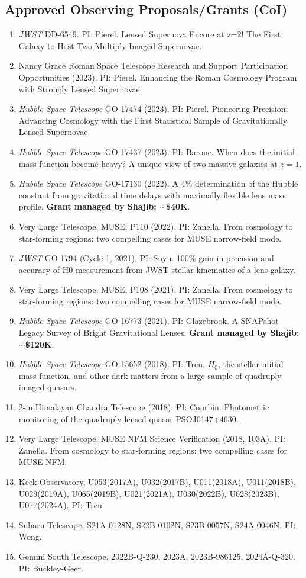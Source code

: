 \documentclass[margin, line]{res}
\begin{document}
\begin{resume}
\section{\sc Approved Observing Proposals/Grants (CoI)}
\begin{enumerate}
\item \textit{JWST} DD-6549. PI: Pierel. Lensed Supernova Encore at z=2! The First Galaxy to Host Two Multiply-Imaged Supernovae. 
\item Nancy Grace Roman Space Telescope Research and Support Participation Opportunities (2023). PI: Pierel. Enhancing the Roman Cosmology Program with Strongly Lensed Supernovae.
\item \textit{Hubble Space Telescope} GO-17474 (2023). PI: Pierel. Pioneering Precision: Advancing Cosmology with the First Statistical Sample of Gravitationally Lensed Supernovae
\item \textit{Hubble Space Telescope} GO-17437 (2023). PI: Barone. When does the initial mass function become heavy? A unique view of two massive galaxies at $z=1$.
\item \textit{Hubble Space Telescope} GO-17130 (2022). A 4\% determination of the Hubble constant from gravitational time delays with maximally flexible lens mass profile. \textbf{Grant managed by Shajib: $\sim$\$40K}.
\item Very Large Telescope, MUSE, P110 (2022). PI: Zanella. From cosmology to star-forming regions: two compelling cases for MUSE narrow-field mode.
\item \textit{JWST} GO-1794 (Cycle 1, 2021). PI: Suyu. 100\% gain in precision and accuracy of H0 measurement from JWST stellar kinematics of a lens galaxy. 
\item Very Large Telescope, MUSE, P108 (2021). PI: Zanella. From cosmology to star-forming regions: two compelling cases for MUSE narrow-field mode.
\item \textit{Hubble Space Telescope} GO-16773 (2021). PI: Glazebrook. A SNAPshot Legacy Survey of Bright Gravitational Lenses. \textbf{Grant managed by Shajib: $\sim$\$120K}.
\item \textit{Hubble Space Telescope} GO-15652 (2018). PI: Treu. $H_0$, the stellar initial mass function, and other dark matters from a large sample of quadruply imaged quasars.
\item 2-m Himalayan Chandra Telescope (2018). PI: Courbin. Photometric monitoring of the quadruply lensed quasar PSOJ0147+4630.
\item Very Large Telescope, MUSE NFM Science Verification (2018, 103A). PI: Zanella. From cosmology to star-forming regions: two compelling cases for MUSE NFM.
\item Keck Observatory, U053(2017A), U032(2017B), U011(2018A),  U011(2018B), U029(2019A), U065(2019B), U021(2021A), U030(2022B), U028(2023B), U077(2024A). PI: Treu.
\item Subaru Telescope, S21A-0128N, S22B-0102N, S23B-0057N, S24A-0046N. PI: Wong.
\item Gemini South Telescope, 2022B-Q-230, 2023A, 2023B-986125, 2024A-Q-320. PI: Buckley-Geer.
\end{enumerate}


\end{resume}
\end{document}
